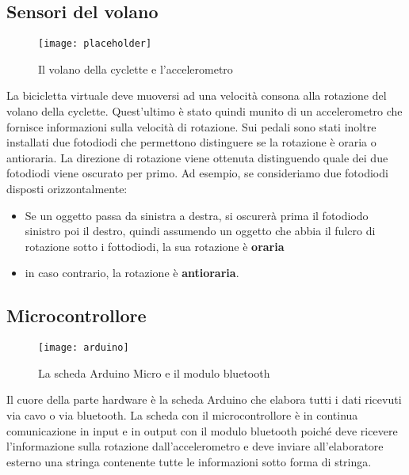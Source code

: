 \subsection{Sensori del volano}
\begin{wrapfigure}{l}{0.4\textwidth} %
    \centering
    \vspace{-0.3cm}
    \texttt{[image: placeholder]}
    \caption{Il volano della cyclette e l'accelerometro}
    \vspace{-1cm}
\end{wrapfigure}
La bicicletta virtuale deve muoversi ad una velocità consona alla rotazione del volano della cyclette. Quest'ultimo è stato quindi munito di un accelerometro che fornisce informazioni sulla velocità di rotazione. Sui pedali sono stati inoltre installati due fotodiodi che permettono distinguere se la rotazione è oraria o antioraria. La direzione di rotazione viene ottenuta distinguendo quale dei due fotodiodi viene oscurato per primo. Ad esempio, se consideriamo due fotodiodi disposti orizzontalmente:\\
\begin{itemize}
  \item Se un oggetto passa da sinistra a destra, si oscurerà prima il fotodiodo sinistro poi il destro, quindi assumendo un oggetto che abbia il fulcro di rotazione sotto i fottodiodi, la sua rotazione è \textbf{oraria}
  \item in caso contrario, la rotazione è \textbf{antioraria}.
\end{itemize}

\subsection{Microcontrollore}
\begin{wrapfigure}{r}{0.4\textwidth} %
    \centering
    \vspace{-1.3cm}
    \texttt{[image: arduino]}
    \caption{La scheda Arduino Micro e il modulo bluetooth}
    \vspace{-1.3cm}
\end{wrapfigure}

Il cuore della parte hardware è la scheda Arduino che elabora tutti i dati ricevuti via cavo o via bluetooth. La scheda con il microcontrollore è in continua comunicazione in input e in output con il modulo bluetooth poiché deve ricevere l'informazione sulla rotazione dall'accelerometro e deve inviare all'elaboratore esterno una stringa contenente tutte le informazioni sotto forma di stringa.
